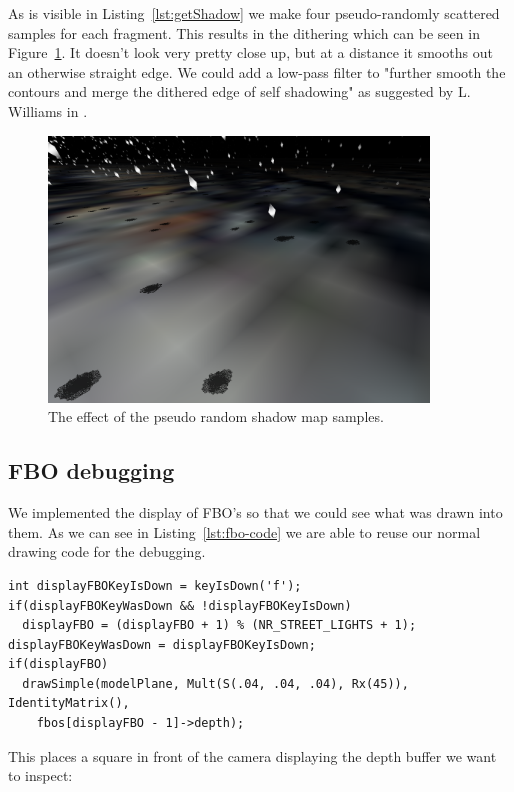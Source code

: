 \documentclass[a4paper,12pt]{article}
\begin{document}
As is visible in Listing~\ref{lst:getShadow} we make four pseudo-randomly scattered samples for each fragment. This results in the dithering which can be seen in Figure~\ref{fig:dithering}. It doesn't look very pretty close up, but at a distance it smooths out an otherwise straight edge. We could add a low-pass filter to "further smooth the contours and merge the dithered edge of self shadowing" as suggested by L. Williams in \cite{shadow-maps}.

\begin{figure}[h]
  \centering
  \includegraphics[width=0.9\textwidth]{dithering}
  \caption{\label{fig:dithering} The effect of the pseudo random shadow map samples.}
\end{figure}

\subsection{FBO debugging}

We implemented the display of FBO's so that we could see what was drawn into them. As we can see in Listing~\ref{lst:fbo-code} we are able to reuse our normal drawing code for the debugging.

\begin{lstlisting}[label=lst:fbo-code,caption= Switching between the FBO's]
int displayFBOKeyIsDown = keyIsDown('f');
if(displayFBOKeyWasDown && !displayFBOKeyIsDown)
  displayFBO = (displayFBO + 1) % (NR_STREET_LIGHTS + 1);
displayFBOKeyWasDown = displayFBOKeyIsDown;
if(displayFBO)
  drawSimple(modelPlane, Mult(S(.04, .04, .04), Rx(45)), IdentityMatrix(),
    fbos[displayFBO - 1]->depth);
\end{lstlisting}

This places a square in front of the camera displaying the depth buffer we want to inspect:
\end{document}
